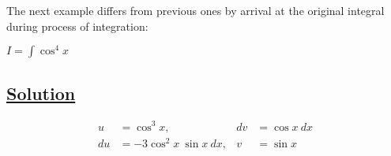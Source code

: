 \documentclass{amsbook}
\begin{document}
The next example differs from previous ones by arrival at the original integral during process of integration: \\

\begin{exmp}
      $I = \int \cos^{4}{x}$
\end{exmp}

\subsection*{\underline{Solution}}
\begin{align*}
u&=\cos^{3}{x},           &  dv &=\cos{x}\ dx\\
du&=-3\cos^{2}{x}\ \sin{x}\ dx,         &  v&=\sin{x}
\end{align*}
\end{document}
